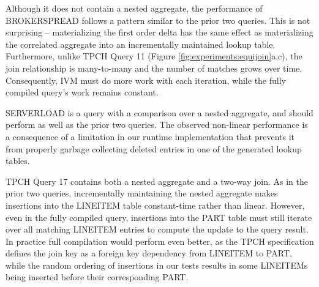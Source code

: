 Although it does not contain a nested aggregate, the performance of BROKERSPREAD follows a pattern similar to the prior two queries.  This is not surprising -- materializing the first order delta has the same effect as materializing the correlated aggregate into an incrementally maintained lookup table.  Furthermore, unlike TPCH Query 11 (Figure \ref{fig:experiments:equijoin}a,c), the join relationship is many-to-many and the number of matches grows over time.  Consequently, IVM must do more work with each iteration, while the fully compiled query's work remains constant.

SERVERLOAD is a query with a comparison over a nested aggregate, and should perform as well as the prior two queries.  The observed non-linear performance is a consequence of a limitation in our runtime implementation that prevents it from properly garbage collecting deleted entries in one of the generated lookup tables.  

TPCH Query 17 contains both a nested aggregate and a two-way join.  As in the prior two queries, incrementally maintaining the nested aggregate makes insertions into the LINEITEM table constant-time rather than linear.  However, even in the fully compiled query, insertions into the PART table must still iterate over all matching LINEITEM entries to compute the update to the query result.  In practice full compilation would perform even better, as the TPCH specification defines the join key as a foreign key dependency from LINEITEM to PART, while the random ordering of insertions in our tests results in some LINEITEMs being inserted before their corresponding PART.


